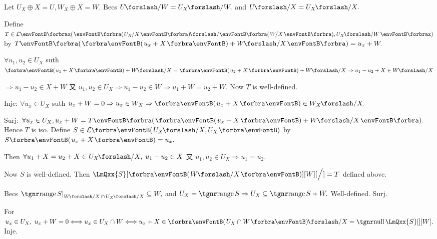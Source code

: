 Let $U_X\oplus X=U,W_X\oplus X=W.$ Becs $U\XSlash W=U_X\XSlash W,$ and $U\XSlash X=U_X\XSlash X.$\vspace{1pt}\par\quad
Define $T\in\Lm[\XPar]{\BigPar{U_X\hspace{-1pt}\Slash X}\XSlash\BigPar{W\hspace{-1.5pt}\Slash X},U_X\XSlash W}$ by $T\BigPar{\Par{u_x+X}+W\XSlash X}=u_x+W.$\par\quad
$\forall u_1,u_2\in U_X$ suth $\Par{u_1+X}+W\XSlash X=\Par{u_2+X}+W\XSlash X\Rightarrow u_1-u_2+X\in W\XSlash X$\par\quad
$\Rightarrow u_1-u_2\in X+W$ 又 $u_1,u_2\in U_X\Rightarrow u_1-u_2\in W\Rightarrow u_1+W=u_2+W.$ \;Now $T$ is well-defined.\par\quad
Inje: $\forall u_x\in U_X$ suth $u_x+W=0\Rightarrow u_x\in W_X\Rightarrow\Par{u_x+X}\in W_X\XSlash X.$\par\quad
Surj: $\forall u_x\in U_X,u_x+W=T\BigPar{\Par{u_x+X}+W\XSlash X}.$ \;Hence $T$ is iso.\PfEnd\vspace{6pt}\quad
\Or Define $S\in\Lm{U_X\XSlash X,U_X}$ by $S\Par{u_x+X}=u_x.$\par\quad
Then $\forall u_1+X=u_2+X\in U_X\XSlash X,\;u_1-u_2\in X$ 又 $u_1,u_2\in U_X\Rightarrow u_1=u_2.$\vspace{2pt}\par\quad
Now $S$ is well-defined. Then $\LmQxx{S}[\SmallPar{W\XSlash X}][W][\Big/]=T$ defined above.\par\quad
Becs $\range S\mmid_{W\XSlash X\,\cap\,U_X\XSlash X}\subseteq W,$ and $U_X=\range S\Rightarrow U_X\subseteq\range S+W.$ \;Well-defined. Surj.\par\quad
For $u_x\in U_X,\;u_x+W=0\Longleftrightarrow u_x\in U_X\cap W\Longleftrightarrow u_x+X\in\Par{U_X\cap W}\XSlash X=\null\LmQxx{S}[][W].$ \;Inje.\PfEnd
\SepLine\pagebreak


